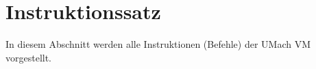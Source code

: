 \chapter{Instruktionssatz}

In diesem Abschnitt werden alle Instruktionen (Befehle) der UMach VM
vorgestellt.




